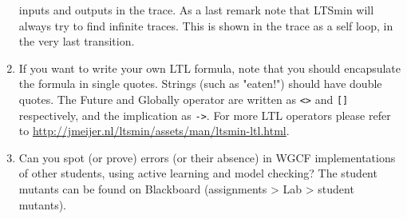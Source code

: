 \documentclass[a4paper]{article}
\begin{document}
\begin{enumerate}
               inputs and outputs in the trace. As a last remark note that LTSmin will always try to find infinite traces. This is shown in the trace as a self loop, in the
               very last transition.
     \item     If you want to write your own LTL formula, note that you should encapsulate the formula in single quotes. Strings (such as "eaten!") should have double quotes.
               The Future and Globally operator are written as \texttt{<>} and \texttt{[]} respectively, and the implication as \texttt{->}.
               For more LTL operators please refer to \url{http://jmeijer.nl/ltsmin/assets/man/ltsmin-ltl.html}.
     \item     Can you spot (or prove) errors (or their absence) in WGCF implementations of other students, using active learning and model checking? The student mutants can be found on Blackboard
               (assignments \textgreater{} Lab \textgreater{} student mutants).
\end{enumerate}
\end{document}
